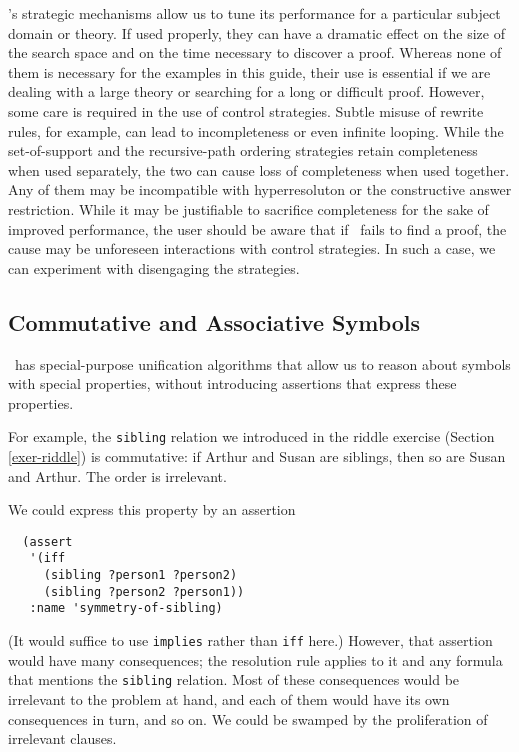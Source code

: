 \Snark\/'s strategic mechanisms allow us to tune its performance for a
particular subject domain or theory.  If used properly, they can have
a dramatic effect on the size of the search space and on the time
necessary to discover a proof.  Whereas none of them is necessary for
the examples in this guide, their use is essential if we are
dealing with a large theory or searching for a long or difficult
proof.  However, some care is required in the use of control
strategies.  Subtle misuse of rewrite rules, for example, can lead to
incompleteness or even infinite looping.  While the set-of-support and
the recursive-path ordering strategies retain completeness when used
separately, the two can cause loss of completeness when used together.
Any of them may be incompatible with hyperresoluton or the
constructive answer restriction.  While it may be justifiable to
sacrifice completeness for the sake of improved performance, the user
should be aware that if \snark\  fails to find a proof, the cause may
be unforeseen interactions with control strategies.  In such a case,
we can experiment with disengaging the strategies.

\subsection{Commutative and Associative Symbols}
\label{subsec-commutative-and-associative}
 \Snark\  has special-purpose unification algorithms that allow us to
reason about symbols with special properties, without introducing
assertions that express these properties.

For example, the {\tt sibling} relation we introduced in the riddle
exercise (Section \ref{exer-riddle}) is commutative: if Arthur and
Susan are siblings, then so are Susan and Arthur.  The order is
irrelevant.

We could express this property by an assertion
\begin{verbatim}
  (assert
   '(iff
     (sibling ?person1 ?person2)
     (sibling ?person2 ?person1))
   :name 'symmetry-of-sibling)
\end{verbatim}
(It would suffice to use {\tt implies} rather than {\tt iff} here.)  However,
that assertion would have many consequences; the resolution rule applies to
it and any formula that mentions the {\tt sibling} relation.  Most of these
consequences would be irrelevant to the problem at hand, and each of them
would have its own consequences in turn, and so on.  We could be swamped by
the proliferation of irrelevant clauses.

